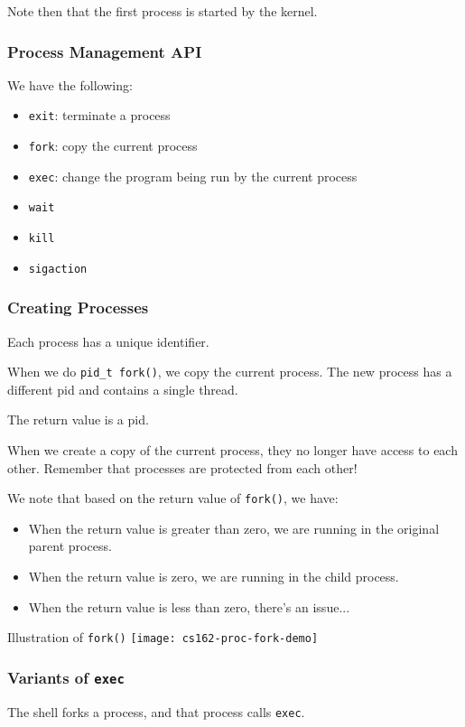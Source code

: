 \documentclass[openany]{book}
\begin{document}
Note then that the first process is started by the kernel.

\subsubsection{Process Management API}
We have the following:
\begin{itemize}
	\item \texttt{exit}: terminate a process
	\item \texttt{fork}: copy the current process
	\item \texttt{exec}: change the program being run by the current process
	\item \texttt{wait}
	\item \texttt{kill}
	\item \texttt{sigaction}
\end{itemize}

\subsubsection{Creating Processes}
Each process has a unique identifier.

When we do \texttt{pid\_t fork()}, we copy the current process. The new process has a different pid and contains a single thread.

The return value is a pid.

When we create a copy of the current process, they no longer have access to each other. Remember that processes are protected from each other!

We note that based on the return value of \texttt{fork()}, we have:
\begin{itemize}
	\item When the return value is greater than zero, we are running in the original parent process.
	\item When the return value is zero, we are running in the child process.
	\item When the return value is less than zero, there's an issue...
\end{itemize}

\begin{figurebox}[]{Illustration of \texttt{fork()}}
	\centering\texttt{[image: cs162-proc-fork-demo]}
\end{figurebox}

\subsubsection{Variants of \texttt{exec}}
The shell forks a process, and that process calls \texttt{exec}.
\end{document}
